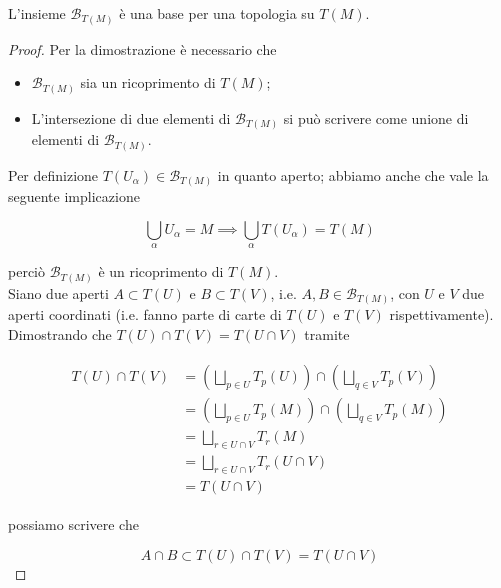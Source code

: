 \begin{definition}
	L'insieme $ \mathcal{B}_{T(M)} $ è una base per una topologia su $ T(M) $.
\end{definition}

\begin{proof}
	Per la dimostrazione è necessario che
	
	\begin{itemize}
		\item $ \mathcal{B}_{T(M)} $ sia un ricoprimento di $ T(M) $;
		
		\item L'intersezione di due elementi di $ \mathcal{B}_{T(M)} $ si può scrivere come unione di elementi di $ \mathcal{B}_{T(M)} $.
	\end{itemize}

	Per definizione $ T(U_{\alpha}) \in \mathcal{B}_{T(M)} $ in quanto aperto; abbiamo anche che vale la seguente implicazione
	
	\begin{equation}
		\bigcup_{\alpha} U_{\alpha} = M \implies \bigcup_{\alpha} T(U_{\alpha}) = T(M)
	\end{equation}

	perciò $ \mathcal{B}_{T(M)} $ è un ricoprimento di $ T(M) $.\\
	Siano due aperti $ A \subset T(U) $ e $ B \subset T(V) $, i.e. $ A,B \in \mathcal{B}_{T(M)} $, con $ U $ e $ V $ due aperti coordinati (i.e. fanno parte di carte di $ T(U) $ e $ T(V) $ rispettivamente). Dimostrando che $ T(U) \cap T(V) = T(U \cap V) $ tramite
	
	\begin{align}
		\begin{split}
			T(U) \cap T(V) &= \left( \bigsqcup_{p \in U} T_{p}(U) \right) \cap \left( \bigsqcup_{q \in V} T_{p}(V) \right)\\
			&= \left( \bigsqcup_{p \in U} T_{p}(M) \right) \cap \left( \bigsqcup_{q \in V} T_{p}(M) \right)\\
			&= \bigsqcup_{r \in U \cap V} T_{r}(M)\\
			&= \bigsqcup_{r \in U \cap V} T_{r}(U \cap V)\\
			&= T(U \cap V)
		\end{split}
	\end{align}
	
	possiamo scrivere che
	
	\begin{equation}
		A \cap B \subset T(U) \cap T(V) = T(U \cap V)
	\end{equation}


\end{proof}
